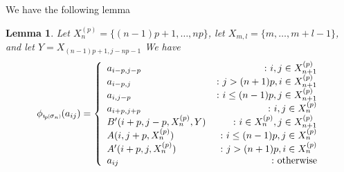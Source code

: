 \documentclass[11pt]{amsart}
\def\s{{\sigma}}
\newcommand*{\subsmallp}[1]{\scalebox{.5}{\ensuremath#1}}
\newcommand{\subpp}[2][p]{\imath_{\hspace*{-1pt}#1}\hspace*{-.5pt}\subsmallp(#2\subsmallp)}
\newtheorem{lem}[thm]{Lemma}
\theoremstyle{definition}
\begin{document}
\noindent We have the following lemma

\begin{lem}\label{Sigma_n}
Let $X_n^{(p)} = \{(n-1)p+1,\ldots,np\}$, let $X_{m,l} = \{m,\ldots,m+l-1\}$,  and let $Y = X_{(n-1)p+1,j-np-1}$  We have
$$
\phi_{\subpp{\s_n}}(a_{ij}) =
\left\{
     \begin{array}{lr}
       a_{i-p,j-p} & \colon i,j\in X_{n+1}^{(p)}\\
       a_{i-p,j} &\colon j > (n+1)p, i\in X_{n+1}^{(p)}\\
       a_{i,j-p} & \colon i\le(n-1)p, j\in X_{n+1}^{(p)}\\
       a_{i+p,j+p} &\colon i,j\in X_n^{(p)}\\
       B'(i+p,j-p,X_n^{(p)},Y) & \colon i\in X_n^{(p)}, j\in X_{n+1}^{(p)}\\
       A(i,j+p,X_n^{(p)}) & \colon i\le(n-1)p, j\in X_n^{(p)}\\
       A'(i+p,j,X_n^{(p)}) & \colon j> (n+1)p, i\in X_n^{(p)}\\
       a_{ij} & \colon \textnormal{otherwise}
     \end{array}
\right.
$$
\end{lem}
\end{document}
